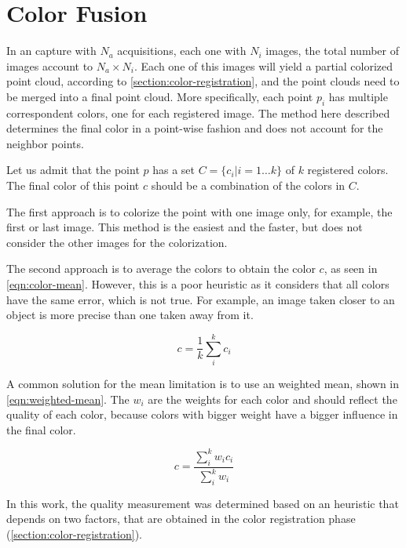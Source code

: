 \section{Color Fusion}
\label{section:color-fusion}

In an capture with $N_a$ acquisitions, each one with $N_i$ images, the total number of images account to $N_a \times N_i$. Each one of this images will yield a partial colorized point cloud, according to \cref{section:color-registration}, and the point clouds need to be merged into a final point cloud. More specifically, each point $p_i$ has multiple correspondent colors, one for each registered image. The method here described determines the final color in a point-wise fashion and does not account for the neighbor points.

Let us admit that the point $p$ has a set $C = \{c_i|i=1\dots k\}$ of $k$ registered colors. The final color of this point $c$ should be a combination of the colors in $C$. 

The first approach is to colorize the point with one image only, for example, the first or last image. This method is the easiest and the faster, but does not consider the other images for the colorization. 

The second approach is to average the colors to obtain the color $c$, as seen in \cref{eqn:color-mean}. However, this is a poor heuristic as it considers that all colors have the same error, which is not true. For example, an image taken closer to an object is more precise than one taken away from it. 

\begin{equation}
    \label{eqn:color-mean}
    c = \frac{1}{k} \sum_{i}^{k}{c_i}
\end{equation}

A common solution for the mean limitation is to use an weighted mean, shown in \cref{eqn:weighted-mean}. The $w_i$ are the weights for each color and should reflect the quality of each color, because colors with bigger weight have a bigger influence in the final color.

\begin{equation}
    \label{eqn:weighted-mean}
    c = \frac{\sum_{i}^{k}{w_i c_i}}{\sum_{i}^{k}{w_i}}
\end{equation}

In this work, the quality measurement was determined based on an heuristic that depends on two factors, that are obtained in the color registration phase (\cref{section:color-registration}).


